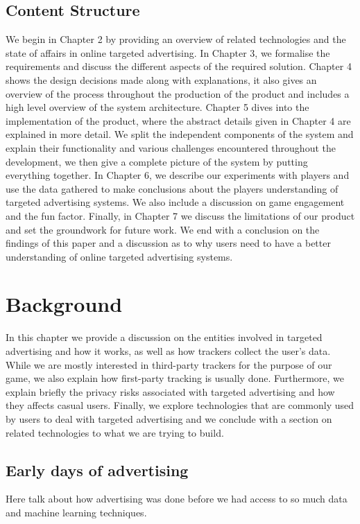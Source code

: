 \documentclass{l4proj}
\begin{document}
\section{Content Structure}
We begin in Chapter 2 by providing an overview of related technologies and the state of affairs in online targeted advertising. In Chapter 3, we formalise the requirements and discuss the different aspects of the required solution. Chapter 4 shows the design decisions made along with explanations, it also gives an overview of the process throughout the production of the product and includes a high level overview of the system architecture. Chapter 5 dives into the implementation of the product, where the abstract details given in Chapter 4 are explained in more detail. We split the independent components of the system and explain their functionality and various challenges encountered throughout the development, we then give a complete picture of the system by putting everything together. In Chapter 6, we describe our experiments with players and use the data gathered to make conclusions about the players understanding of targeted advertising systems. We also include a discussion on game engagement and the fun factor. Finally, in Chapter 7 we discuss the limitations of our product and set the groundwork for future work. We end with a conclusion on the findings of this paper and a discussion as to why users need to have a better understanding of online targeted advertising systems.


\chapter{Background}
In this chapter we provide a discussion on the entities involved in targeted advertising and how it works, as well as how trackers collect the user's data. While we are mostly interested in third-party trackers for the purpose of our game, we also explain how first-party tracking is usually done. Furthermore, we explain briefly the privacy risks associated with targeted advertising and how they affects casual users. Finally, we explore technologies that are commonly used by users to deal with targeted advertising and we conclude with a section on related technologies to what we are trying to build.

\section{Early days of advertising}
Here talk about how advertising was done before we had access to so much data and machine learning techniques.
\end{document}
